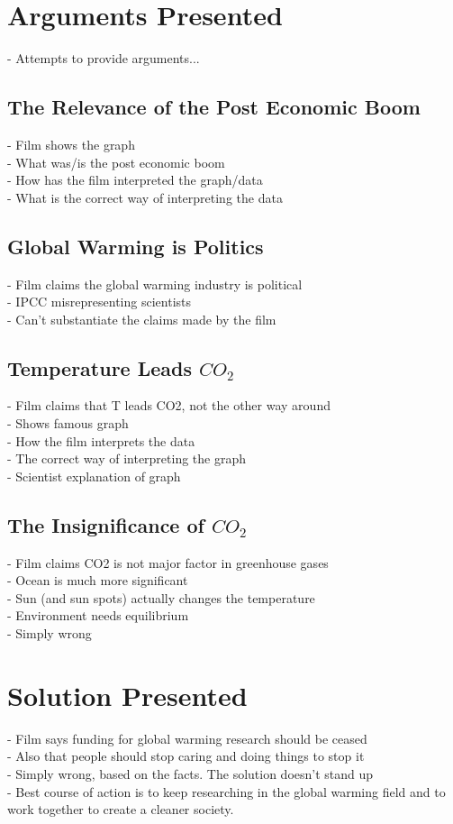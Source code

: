 \documentclass[12pt]{article}
\begin{document}
\section{Arguments Presented}
	- Attempts to provide arguments...\\
\subsection{The Relevance of the Post Economic Boom}
	- Film shows the graph\\
	- What was/is the post economic boom\\
	- How has the film interpreted the graph/data\\
	- What is the correct way of interpreting the data\\
\subsection{Global Warming is Politics}	
	- Film claims the global warming industry is political\\
	- IPCC misrepresenting scientists\\
	- Can't substantiate the claims made by the film\\
\subsection{Temperature Leads $CO_2$}
	- Film claims that T leads CO2, not the other way around\\
	- Shows famous graph\\
	- How the film interprets the data\\
	- The correct way of interpreting the graph\\
	- Scientist explanation of graph\\
\subsection{The Insignificance of $CO_2$}
	- Film claims CO2 is not major factor in greenhouse gases\\
	- Ocean is much more significant\\
	- Sun (and sun spots) actually changes the temperature\\
	- Environment needs equilibrium\\
	- Simply wrong \\
\section{Solution Presented}
	- Film says funding for global warming research should be ceased\\
	- Also that people should stop caring and doing things to stop it\\
	- Simply wrong, based on the facts. The solution doesn't stand up\\
	- Best course of action is to keep researching in the global warming field and to work together to create a cleaner society.\\
\end{document}
